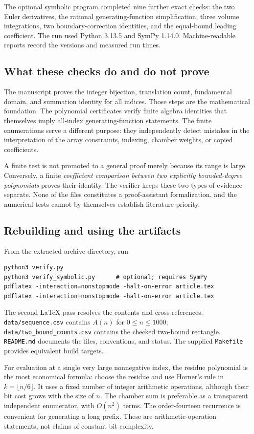 \documentclass[11pt]{article}
\numberwithin{equation}{section}
\theoremstyle{definition}
\begin{document}
The optional symbolic program completed nine further exact checks: the two
Euler derivatives, the rational generating-function simplification, three
volume integrations, two boundary-correction identities, and the equal-bound
leading coefficient. The run used Python 3.13.5 and SymPy 1.14.0. Machine-readable
reports record the versions and measured run times.

\subsection{What these checks do and do not prove}
The manuscript proves the integer bijection, translation count, fundamental
domain, and summation identity for all indices. Those steps are the
mathematical foundation. The polynomial certificates verify finite algebra
identities that themselves imply all-index generating-function statements.
The finite enumerations serve a different purpose: they independently detect
mistakes in the interpretation of the array constraints, indexing, chamber
weights, or copied coefficients.

A finite test is not promoted to a general proof merely because its range is
large. Conversely, a finite \emph{coefficient comparison between two explicitly
bounded-degree polynomials} proves their identity. The verifier keeps these
two types of evidence separate. None of the files constitutes a
proof-assistant formalization, and the numerical tests cannot by themselves
establish literature priority.

\subsection{Rebuilding and using the artifacts}
From the extracted archive directory, run
\begin{verbatim}
python3 verify.py
python3 verify_symbolic.py      # optional; requires SymPy
pdflatex -interaction=nonstopmode -halt-on-error article.tex
pdflatex -interaction=nonstopmode -halt-on-error article.tex
\end{verbatim}
The second LaTeX pass resolves the contents and cross-references.
\texttt{data/sequence.csv} contains $A(n)$ for $0\leq n\leq1000$;
\texttt{data/two\_bound\_counts.csv} contains the checked two-bound rectangle.
\texttt{README.md} documents the files, conventions, and status. The supplied
\texttt{Makefile} provides equivalent build targets.

For evaluation at a single very large nonnegative index, the residue
polynomial is the most economical formula: choose the residue and use Horner's
rule in $k=\lfloor n/6\rfloor$. It uses a fixed number of integer arithmetic
operations, although their bit cost grows with the size of $n$. The chamber
sum is preferable as a transparent independent enumerator, with $O(n^2)$
terms. The order-fourteen recurrence is convenient for generating a long
prefix. These are arithmetic-operation statements, not claims of constant
bit complexity.
\end{document}
